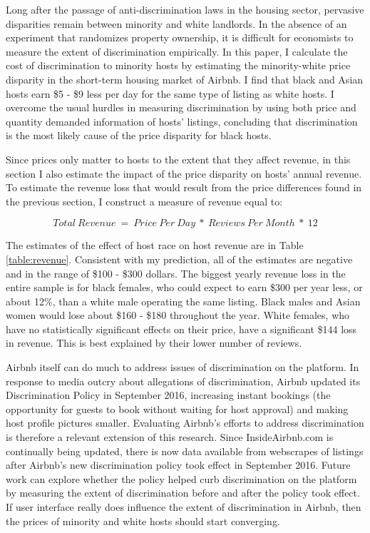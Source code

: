 
Long after the passage of anti-discrimination laws in the housing sector, pervasive disparities remain between minority and white landlords. In the absence of an experiment that randomizes property ownership, it is difficult for economists to measure the extent of discrimination empirically. In this paper, I calculate the cost of discrimination to minority hosts by estimating the minority-white price disparity in the short-term housing market of Airbnb. I find that black and Asian hosts earn \$5 - \$9 less per day for the same type of listing as white hosts. I overcome the usual hurdles in measuring discrimination by using both price and quantity demanded information of hosts' listings, concluding that discrimination is the most likely cause of the price disparity for black hosts. 

Since prices only matter to hosts to the extent that they affect revenue, in this section I also estimate the impact of the price disparity on hosts' annual revenue. To estimate the revenue loss that would result from the price differences found in the previous section, I construct a measure of revenue equal to: 

\[Total \: Revenue \ = \ Price \: Per \: Day \ * \ Reviews \: Per \: Month \ * \ 12\] 

The estimates of the effect of host race on host revenue are in Table \ref{table:revenue}. Consistent with my prediction, all of the estimates are negative and in the range of \$100 - \$300 dollars. The biggest yearly revenue loss in the entire sample is for black females, who could expect to earn \$300 per year less, or about 12\%, than a white male operating the same listing. Black males and Asian women would lose about \$160 - \$180 throughout the year. White females, who have no statistically significant effects on their price, have a significant \$144 loss in revenue. This is best explained by their lower number of reviews. 

Airbnb itself can do much to address issues of discrimination on the platform. In response to media outcry about allegations of discrimination, Airbnb updated its Discrimination Policy in September 2016, increasing instant bookings (the opportunity for guests to book without waiting for host approval) and making host profile pictures smaller. Evaluating Airbnb's efforts to address discrimination is therefore a relevant extension of this research. Since InsideAirbnb.com is continually being updated, there is now data available from webscrapes of listings after Airbnb's new discrimination policy took effect in September 2016. Future work can explore whether the policy helped curb discrimination on the platform by measuring the extent of discrimination before and after the policy took effect. If user interface really does influence the extent of discrimination in Airbnb, then the prices of minority and white hosts should start converging. 

